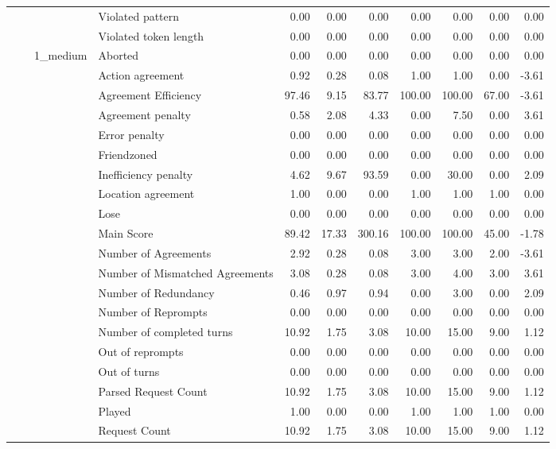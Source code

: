 \begin{tabular}{llllrrrrrrr}
 &  &  & Violated pattern & 0.00 & 0.00 & 0.00 & 0.00 & 0.00 & 0.00 & 0.00 \\
 &  &  & Violated token length & 0.00 & 0.00 & 0.00 & 0.00 & 0.00 & 0.00 & 0.00 \\
\cline{3-11}
 &  & \multirow[t]{27}{*}{1_medium} & Aborted & 0.00 & 0.00 & 0.00 & 0.00 & 0.00 & 0.00 & 0.00 \\
 &  &  & Action agreement & 0.92 & 0.28 & 0.08 & 1.00 & 1.00 & 0.00 & -3.61 \\
 &  &  & Agreement Efficiency & 97.46 & 9.15 & 83.77 & 100.00 & 100.00 & 67.00 & -3.61 \\
 &  &  & Agreement penalty & 0.58 & 2.08 & 4.33 & 0.00 & 7.50 & 0.00 & 3.61 \\
 &  &  & Error penalty & 0.00 & 0.00 & 0.00 & 0.00 & 0.00 & 0.00 & 0.00 \\
 &  &  & Friendzoned & 0.00 & 0.00 & 0.00 & 0.00 & 0.00 & 0.00 & 0.00 \\
 &  &  & Inefficiency penalty & 4.62 & 9.67 & 93.59 & 0.00 & 30.00 & 0.00 & 2.09 \\
 &  &  & Location agreement & 1.00 & 0.00 & 0.00 & 1.00 & 1.00 & 1.00 & 0.00 \\
 &  &  & Lose & 0.00 & 0.00 & 0.00 & 0.00 & 0.00 & 0.00 & 0.00 \\
 &  &  & Main Score & 89.42 & 17.33 & 300.16 & 100.00 & 100.00 & 45.00 & -1.78 \\
 &  &  & Number of Agreements & 2.92 & 0.28 & 0.08 & 3.00 & 3.00 & 2.00 & -3.61 \\
 &  &  & Number of Mismatched Agreements & 3.08 & 0.28 & 0.08 & 3.00 & 4.00 & 3.00 & 3.61 \\
 &  &  & Number of Redundancy & 0.46 & 0.97 & 0.94 & 0.00 & 3.00 & 0.00 & 2.09 \\
 &  &  & Number of Reprompts & 0.00 & 0.00 & 0.00 & 0.00 & 0.00 & 0.00 & 0.00 \\
 &  &  & Number of completed turns & 10.92 & 1.75 & 3.08 & 10.00 & 15.00 & 9.00 & 1.12 \\
 &  &  & Out of reprompts & 0.00 & 0.00 & 0.00 & 0.00 & 0.00 & 0.00 & 0.00 \\
 &  &  & Out of turns & 0.00 & 0.00 & 0.00 & 0.00 & 0.00 & 0.00 & 0.00 \\
 &  &  & Parsed Request Count & 10.92 & 1.75 & 3.08 & 10.00 & 15.00 & 9.00 & 1.12 \\
 &  &  & Played & 1.00 & 0.00 & 0.00 & 1.00 & 1.00 & 1.00 & 0.00 \\
 &  &  & Request Count & 10.92 & 1.75 & 3.08 & 10.00 & 15.00 & 9.00 & 1.12 \\

\end{tabular}
